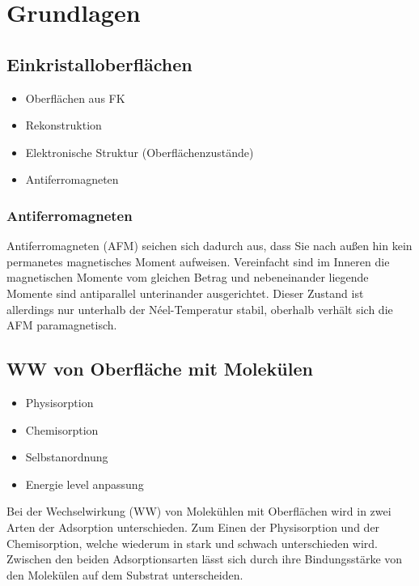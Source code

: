 \chapter{Grundlagen}
\section{Einkristalloberflächen}
    \begin{itemize}
        \item Oberflächen aus FK
        \item Rekonstruktion
        \item Elektronische Struktur (Oberflächenzustände)
        \item Antiferromagneten
    \end{itemize}
    \subsection{Antiferromagneten}
    Antiferromagneten (AFM) seichen sich dadurch aus, dass Sie nach außen hin kein permanetes magnetisches Moment aufweisen.
    Vereinfacht sind im Inneren die magnetischen Momente vom gleichen Betrag und nebeneinander liegende Momente sind antiparallel unterinander ausgerichtet.
    Dieser Zustand ist allerdings nur unterhalb der Néel-Temperatur stabil, oberhalb verhält sich die AFM paramagnetisch.

\section{WW von Oberfläche mit Molekülen}
    \cite{ma-DJ}
    \begin{itemize}
        \item Physisorption
        \item Chemisorption
        \item Selbstanordnung
        \item Energie level anpassung
    \end{itemize}
    Bei der Wechselwirkung (WW) von Molekühlen mit Oberflächen wird in zwei Arten der Adsorption unterschieden. 
    Zum Einen der Physisorption und der Chemisorption, welche wiederum in stark und schwach unterschieden wird.
    Zwischen den beiden Adsorptionsarten lässt sich durch ihre Bindungsstärke von den Molekülen auf dem Substrat unterscheiden.
